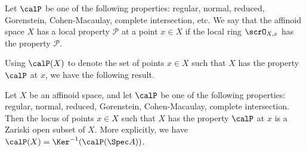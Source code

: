     \begin{definition}\label{def:local_properities_of_affinoid_space}
        Let \(\calP\) be one of the following properties: regular, normal, reduced, Gorenstein, Cohen-Macaulay, complete intersection, etc.
        We say that the affinoid space \(X\) has a local property \(\mathcal{P}\) at a point \(x \in X\) if the local ring \(\scrO_{X,x}\) has the property \(\mathcal{P}\).
    \end{definition}

    Using \(\calP(X)\) to denote the set of points \(x \in X\) such that \(X\) has the property \(\calP\) at \(x\), we have the following result.

    \begin{theorem}\label{thm:openness_of_P_locus_regular_normal_reduced_Gorenstein_CM_complete_intersection}
        Let \(X\) be an affinoid space, and let \(\calP\) be one of the following properties: regular, normal, reduced, Gorenstein, Cohen-Macaulay, complete intersection.
        Then the locus of points \(x \in X\) such that \(X\) has the property \(\calP\) at \(x\) is a Zariski open subset of \(X\).
        More explicitly, we have \(\calP(X) = \Ker^{-1}(\calP(\Spec A))\).
    \end{theorem}